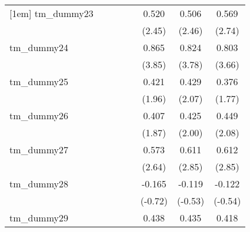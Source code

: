 {\begin{tabular}{l*{7}{c}}
[1em]
tm\_dummy23  &                     &                     &                     &                     &       0.520\sym{*}  &       0.506\sym{*}  &       0.569\sym{**} \\
            &                     &                     &                     &                     &      (2.45)         &      (2.46)         &      (2.74)         \\
[1em]
tm\_dummy24  &                     &                     &                     &                     &       0.865\sym{***}&       0.824\sym{***}&       0.803\sym{***}\\
            &                     &                     &                     &                     &      (3.85)         &      (3.78)         &      (3.66)         \\
[1em]
tm\_dummy25  &                     &                     &                     &                     &       0.421         &       0.429\sym{*}  &       0.376         \\
            &                     &                     &                     &                     &      (1.96)         &      (2.07)         &      (1.77)         \\
[1em]
tm\_dummy26  &                     &                     &                     &                     &       0.407         &       0.425\sym{*}  &       0.449\sym{*}  \\
            &                     &                     &                     &                     &      (1.87)         &      (2.00)         &      (2.08)         \\
[1em]
tm\_dummy27  &                     &                     &                     &                     &       0.573\sym{**} &       0.611\sym{**} &       0.612\sym{**} \\
            &                     &                     &                     &                     &      (2.64)         &      (2.85)         &      (2.85)         \\
[1em]
tm\_dummy28  &                     &                     &                     &                     &      -0.165         &      -0.119         &      -0.122         \\
            &                     &                     &                     &                     &     (-0.72)         &     (-0.53)         &     (-0.54)         \\
[1em]
tm\_dummy29  &                     &                     &                     &                     &       0.438\sym{*}  &       0.435\sym{*}  &       0.418\sym{*}  \\

\end{tabular}}
